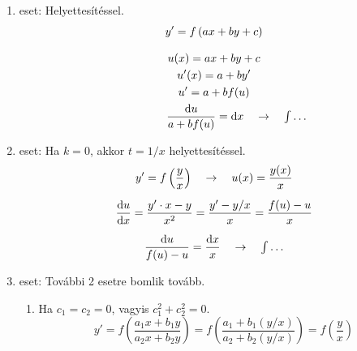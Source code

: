 \documentclass[main.tex]{subfiles}
\begin{document}
\begin{enumerate}
  \item eset: Helyettesítéssel.
        \begin{gather*}
          y' = f \left( ax + by + c \right) \\[3mm]
          u(x) = a x + b y + c \\
          u'(x) = a + b y' \\
          u' = a + b f(u) \\
          \hspace{4em}
          \frac{\mathrm{d} u}{a + b f(u)}
          = \mathrm{d} x
          \quad \rightarrow \quad {\textstyle\int \dots}
        \end{gather*}

  \item eset: Ha $k = 0$, akkor $t = 1/x$ helyettesítéssel.
        \begin{gather*}
          y' = f \left( \frac{y}{x}\right)
          \quad \rightarrow \quad
          u(x) = \frac{y(x)}{x}
          \\[2mm]
          \derivative{u}{x}
          = \frac{y' \cdot x - y}{x^2}
          = \frac{y' - y/x}{x}
          = \frac{f(u) - u}{x}
          \\[2mm]
          \frac{\differential u}{f(u) - u}
          = \frac{\differential x}{x}
          \quad \rightarrow \quad {\textstyle\int \dots}
        \end{gather*}


  \item eset: További 2 esetre bomlik tovább.
        \begin{enumerate}
          \item Ha $c_1 = c_2 = 0$, vagyis $c_1^2 + c_2^2 = 0$.
                \begin{equation*}
                  y' = f \left(
                  \frac{ a_1 x + b_1 y }{a_2 x + b_2 y}
                  \right) = f \left(
                  \frac{a_1 + b_1 (y / x)}{a_2 + b_2 (y / x)}
                  \right) = f \left(
                  \frac{y}{x}
                  \right)
                \end{equation*}


\end{enumerate}
\end{enumerate}
\end{document}
